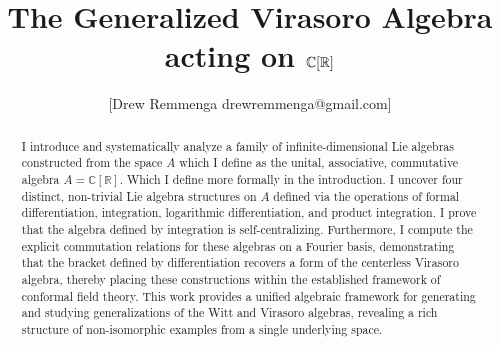 \documentclass{artjlt}
\title{The Generalized Virasoro Algebra acting on $\C[\R]$}
\author{[Drew Remmenga drewremmenga@gmail.com]}
\newcommand{\?}{\textbackslash}
\newcommand{\C}{\mathbb{C}}
\newcommand{\R}{\mathbb{R}}
\begin{document}
\nocite{*}

\maketitle
\begin{abstract}
I introduce and systematically analyze a family of infinite-dimensional Lie algebras constructed from the space $A$ which I define as the unital, associative, commutative algebra $A=\C[\R]$. Which I define more formally in the introduction. 
I uncover four distinct, non-trivial Lie algebra structures on $A$ defined via the operations of formal differentiation, integration, logarithmic differentiation, and product integration. 
I prove that the algebra defined by integration is self-centralizing. Furthermore, I compute the explicit commutation relations for these algebras on a Fourier basis, demonstrating that the bracket defined by differentiation recovers a form of the centerless Virasoro algebra, thereby placing these constructions within the established framework of conformal field theory. This work provides a unified algebraic framework for generating and studying generalizations of the Witt and Virasoro algebras, revealing a rich structure of non-isomorphic examples from a single underlying space.
\end{abstract}
\end{document}
